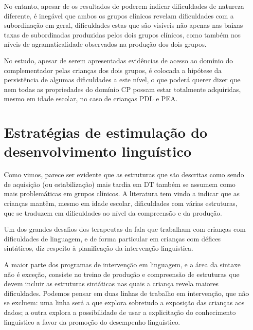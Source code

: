 \documentclass[output=paper,colorlinks,citecolor=brown,booklanguage=portuguese]{langscibook}
\begin{document}
No entanto, apesar de os resultados de \citet{Martinsempreparacao} poderem indicar dificuldades de natureza diferente, é inegável que ambos os grupos clínicos revelam dificuldades com a subordinação em geral, dificuldades estas que são visíveis não apenas nas baixas taxas de subordinadas produzidas pelos dois grupos clínicos, como também nos níveis de agramaticalidade observados na produção dos dois grupos. 

No estudo, apesar de serem apresentadas evidências de acesso ao domínio do complementador pelas crianças dos dois grupos, é colocada a hipótese da persistência de algumas dificuldades a este nível, o que poderá querer dizer que nem todas as propriedades do domínio CP possam estar totalmente adquiridas, mesmo em idade escolar, no caso de crianças PDL e PEA. 

\section{Estratégias de estimulação do desenvolvimento linguístico }
Como vimos, parece ser evidente que as estruturas que são descritas como sendo de aquisição (ou estabilização) mais tardia em DT também se assumem como mais problemáticas em grupos clínicos. A literatura tem vindo a indicar que as crianças mantêm, mesmo em idade escolar, dificuldades com várias estruturas, que se traduzem em dificuldades ao nível da compreensão e da produção. 

Um dos grandes desafios dos terapeutas da fala que trabalham com crianças com dificuldades de linguagem, e de forma particular em crianças com défices sintáticos, diz respeito à planificação da intervenção linguística. 

A maior parte dos programas de intervenção em linguagem, e a área da sintaxe não é exceção, consiste no treino de produção e compreensão de estruturas que devem incluir as estruturas sintáticas nas quais a criança revela maiores dificuldades. Podemos pensar em duas linhas de trabalho em intervenção, que não se excluem: uma linha será a que explora sobretudo a exposição das crianças aos dados; a outra explora a possibilidade de usar a explicitação do conhecimento linguístico a favor da promoção do desempenho linguístico. 
\end{document}
